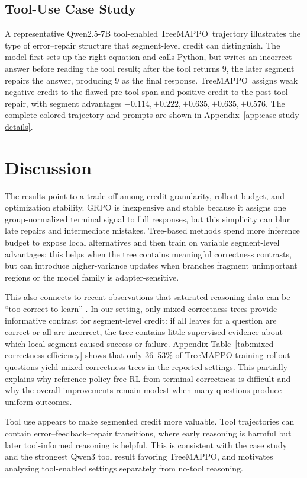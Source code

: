 \documentclass{article}
\newcommand{\ours}{TreeMAPPO\xspace}
\begin{document}
\subsection{Tool-Use Case Study}
A representative Qwen2.5-7B tool-enabled \ours\ trajectory illustrates the type of error--repair structure that segment-level credit can distinguish. The model first sets up the right equation and calls Python, but writes an incorrect answer before reading the tool result; after the tool returns $9$, the later segment repairs the answer, producing $\boxed{9}$ as the final response. \ours\ assigns weak negative credit to the flawed pre-tool span and positive credit to the post-tool repair, with segment advantages $-0.114,+0.222,+0.635,+0.635,+0.576$. The complete colored trajectory and prompts are shown in Appendix~\ref{app:case-study-details}.

\section{Discussion}
The results point to a trade-off among credit granularity, rollout budget, and optimization stability. GRPO is inexpensive and stable because it assigns one group-normalized terminal signal to full responses, but this simplicity can blur late repairs and intermediate mistakes. Tree-based methods spend more inference budget to expose local alternatives and then train on variable segment-level advantages; this helps when the tree contains meaningful correctness contrasts, but can introduce higher-variance updates when branches fragment unimportant regions or the model family is adapter-sensitive.

This also connects to recent observations that saturated reasoning data can be ``too correct to learn'' \cite{cuts2026}. In our setting, only mixed-correctness trees provide informative contrast for segment-level credit: if all leaves for a question are correct or all are incorrect, the tree contains little supervised evidence about which local segment caused success or failure. Appendix Table~\ref{tab:mixed-correctness-efficiency} shows that only 36--53\% of TreeMAPPO training-rollout questions yield mixed-correctness trees in the reported settings. This partially explains why reference-policy-free RL from terminal correctness is difficult and why the overall improvements remain modest when many questions produce uniform outcomes.

Tool use appears to make segmented credit more valuable. Tool trajectories can contain error--feedback--repair transitions, where early reasoning is harmful but later tool-informed reasoning is helpful. This is consistent with the case study and the strongest Qwen3 tool result favoring \ours, and motivates analyzing tool-enabled settings separately from no-tool reasoning.
\end{document}
